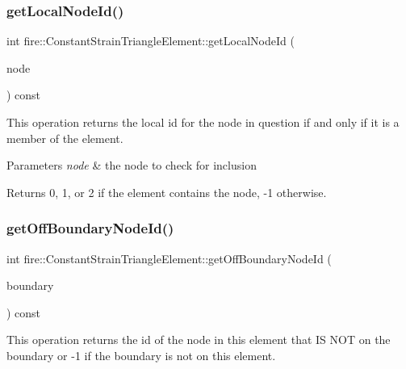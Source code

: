 \subsubsection{\texorpdfstring{get\+Local\+Node\+Id()}{getLocalNodeId()}}
{\footnotesize\ttfamily int fire\+::\+Constant\+Strain\+Triangle\+Element\+::get\+Local\+Node\+Id (\begin{DoxyParamCaption}\item[{const \hyperlink{a00198_a92dafcc05a788e1065a5792b67f0f70e}{Two\+D\+Node} \&}]{node }\end{DoxyParamCaption}) const}

This operation returns the local id for the node in question if and only if it is a member of the element. 
\begin{DoxyParams}{Parameters}
{\em node} & the node to check for inclusion \\
\hline
\end{DoxyParams}
\begin{DoxyReturn}{Returns}
0, 1, or 2 if the element contains the node, -\/1 otherwise. 
\end{DoxyReturn}
\mbox{\label{a00773_a6f65ab76e065f67fd5cef71e2e8c9628}} 
\subsubsection{\texorpdfstring{get\+Off\+Boundary\+Node\+Id()}{getOffBoundaryNodeId()}}
{\footnotesize\ttfamily int fire\+::\+Constant\+Strain\+Triangle\+Element\+::get\+Off\+Boundary\+Node\+Id (\begin{DoxyParamCaption}\item[{const \hyperlink{a00789}{Two\+D\+Robin\+Boundary\+Condition} \&}]{boundary }\end{DoxyParamCaption}) const}

This operation returns the id of the node in this element that IS N\+OT on the boundary or -\/1 if the boundary is not on this element. \mbox{\label{a00773_acf4734f5fbc56b700c29d637baf78b9f}} 
